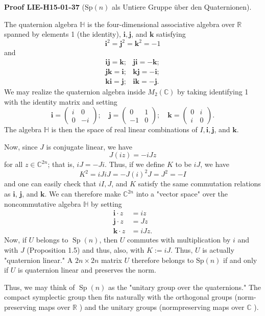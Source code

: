 \documentclass[10pt, letterpaper]{article}
\newcommand{\Sp}{\mathrm{Sp}}
\newcommand{\CustomHeading}[3]{%
  \par\medskip\noindent%
  \textbf{#1 #2} \textnormal{(#3)}.\enskip%
}
\newenvironment{PROOF}[2]{\CustomHeading{Proof}{#1}{#2}}{}
\begin{document}
\begin{PROOF}{LIE-H15-01-37}{$\Sp(n)$ als Untiere Gruppe über den Quaternionen}
The quaternion algebra $\mathbb{H}$ is the four-dimensional associative algebra over $\mathbb{R}$ spanned by elements 1 (the identity), $\mathbf{i}, \mathbf{j}$, and $\mathbf{k}$ satisfying
$$
\mathbf{i}^{2}=\mathbf{j}^{2}=\mathbf{k}^{2}=-1
$$
and
$$
\begin{aligned}
\mathbf{i j}=\mathbf{k} ; & \mathbf{j i}=-\mathbf{k} ; \\
\mathbf{j k}=\mathbf{i} ; & \mathbf{k j}=-\mathbf{i} ; \\
\mathbf{k i}=\mathbf{j} ; & \mathbf{i k}=-\mathbf{j} .
\end{aligned}
$$
We may realize the quaternion algebra inside $M_{2}(\mathbb{C})$ by taking identifying 1 with the identity matrix and setting
$$
\mathbf{i}=\left(\begin{array}{rr}
i & 0 \\
0 & -i
\end{array}\right) ; \quad \mathbf{j}=\left(\begin{array}{rr}
0 & 1 \\
-1 & 0
\end{array}\right) ; \quad \mathbf{k}=\left(\begin{array}{cc}
0 & i \\
i & 0
\end{array}\right) .
$$
The algebra $\mathbb{H}$ is then the space of real linear combinations of $I, \mathbf{i}, \mathbf{j}$, and $\mathbf{k}$.


Now, since $J$ is conjugate linear, we have
$$
J(i z)=-i J z
$$
for all $z \in \mathbb{C}^{2 n}$; that is, $i J=-J i$. Thus, if we define $K$ to be $i J$, we have
$$
K^{2}=i J i J=-J(i)^{2} J=J^{2}=-I
$$
and one can easily check that $i I, J$, and $K$ satisfy the same commutation relations as $\mathbf{i}$, $\mathbf{j}$, and $\mathbf{k}$. We can therefore make $\mathbb{C}^{2 n}$ into a "vector space" over the noncommutative algebra $\mathbb{H}$ by setting
$$
\begin{aligned}
\mathbf{i} \cdot z & =i z \\
\mathbf{j} \cdot z & =J z \\
\mathbf{k} \cdot z & =i J z .
\end{aligned}
$$
Now, if $U$ belongs to $\operatorname{Sp}(n)$, then $U$ commutes with multiplication by $i$ and with $J$ (Proposition 1.5) and thus, also, with $K:=i J$. Thus, $U$ is actually "quaternion linear." A $2 n \times 2 n$ matrix $U$ therefore belongs to $\mathrm{Sp}(n)$ if and only if $U$ is quaternion linear and preserves the norm. 

Thus, we may think of $\operatorname{Sp}(n)$ as the "unitary group over the quaternions." The compact symplectic group then fits naturally with the orthogonal groups (norm-preserving maps over $\mathbb{R}$ ) and the unitary groups (normpreserving maps over $\mathbb{C}$ ).
\end{PROOF}
\end{document}
